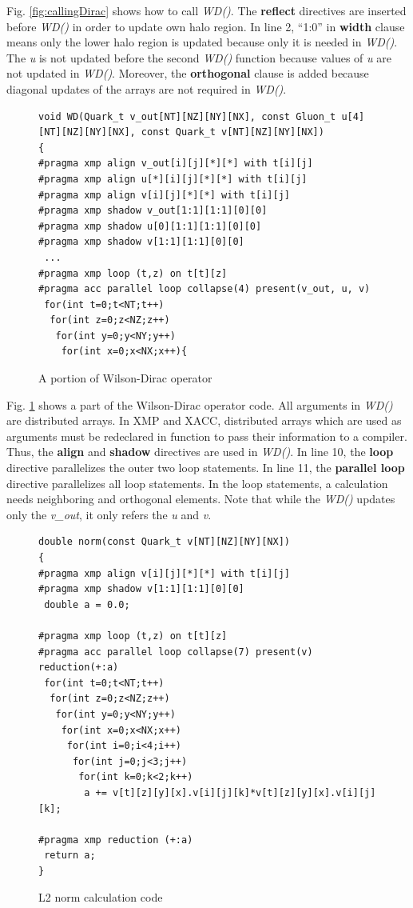 Fig. \ref{fig:callingDirac} shows how to call {\it WD()}.
The  {\bf reflect} directives are inserted before {\it WD()} in order to update own halo region.
In line 2,
``1:0'' in {\bf width} clause means only the lower halo region is updated because only it is needed in {\it WD()}.
The {\it u} is not updated before the second {\it WD()} function because values of {\it u} are not updated in {\it WD()}.
Moreover,
the {\bf orthogonal} clause is added because diagonal updates of the arrays are not required in {\it WD()}.

\begin{figure}[h]
\centering
\begin{lstlisting}
void WD(Quark_t v_out[NT][NZ][NY][NX], const Gluon_t u[4][NT][NZ][NY][NX], const Quark_t v[NT][NZ][NY][NX])
{
#pragma xmp align v_out[i][j][*][*] with t[i][j]
#pragma xmp align u[*][i][j][*][*] with t[i][j]
#pragma xmp align v[i][j][*][*] with t[i][j]
#pragma xmp shadow v_out[1:1][1:1][0][0]
#pragma xmp shadow u[0][1:1][1:1][0][0]
#pragma xmp shadow v[1:1][1:1][0][0]
 ...
#pragma xmp loop (t,z) on t[t][z]
#pragma acc parallel loop collapse(4) present(v_out, u, v)
 for(int t=0;t<NT;t++)
  for(int z=0;z<NZ;z++)
   for(int y=0;y<NY;y++)
    for(int x=0;x<NX;x++){
\end{lstlisting}
\caption{A portion of Wilson-Dirac operator}\label{fig:dirac}
\end{figure}

Fig. \ref{fig:dirac} shows a part of the Wilson-Dirac operator code.
All arguments in {\it WD()} are distributed arrays.
In XMP and XACC,
distributed arrays which are used as arguments must be redeclared in function to pass their information to a compiler.
Thus, the {\bf align} and {\bf shadow} directives are used in {\it WD()}.
In line 10, the {\bf loop} directive parallelizes the outer two loop statements.
In line 11, the {\bf parallel loop} directive parallelizes all loop statements.
In the loop statements,
a calculation needs neighboring and orthogonal elements.
Note that while the {\it WD()} updates only the {\it v\_out},
it only refers the {\it u} and {\it v}.

\begin{figure}[h]
\centering
\begin{lstlisting}
double norm(const Quark_t v[NT][NZ][NY][NX])
{
#pragma xmp align v[i][j][*][*] with t[i][j]
#pragma xmp shadow v[1:1][1:1][0][0]
 double a = 0.0;

#pragma xmp loop (t,z) on t[t][z]
#pragma acc parallel loop collapse(7) present(v) reduction(+:a)
 for(int t=0;t<NT;t++)
  for(int z=0;z<NZ;z++)
   for(int y=0;y<NY;y++)
    for(int x=0;x<NX;x++)
     for(int i=0;i<4;i++)
      for(int j=0;j<3;j++)
       for(int k=0;k<2;k++)
        a += v[t][z][y][x].v[i][j][k]*v[t][z][y][x].v[i][j][k];

#pragma xmp reduction (+:a)
 return a;
}
\end{lstlisting}
\caption{L2 norm calculation code}\label{fig:norm}
\end{figure}

